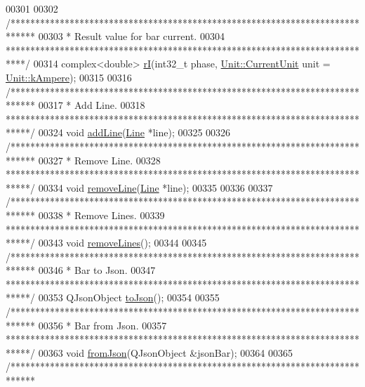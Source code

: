 \begin{DoxyCode}
00301 
00302   \textcolor{comment}{/*****************************************************************************}
00303 \textcolor{comment}{   * Result value for bar current.}
00304 \textcolor{comment}{   ****************************************************************************/}
00314   complex<double> \hyperlink{group___models_ga8a009531f01430aa68eba739bb0dc2ea}{rI}(int32\_t phase, \hyperlink{class_unit_a0794cf6c9682f48296dd4a5315389787}{Unit::CurrentUnit} unit = 
      \hyperlink{class_unit_a0794cf6c9682f48296dd4a5315389787a368a3c470f0b590a6100dda717a7dd4f}{Unit::kAmpere});
00315 
00316   \textcolor{comment}{/*****************************************************************************}
00317 \textcolor{comment}{  * Add Line.}
00318 \textcolor{comment}{  *****************************************************************************/}
00324   \textcolor{keywordtype}{void} \hyperlink{group___models_ga8cbd2f62d92e69ce6c8d561b682464b6}{addLine}(\hyperlink{class_line}{Line} *line);
00325 
00326   \textcolor{comment}{/*****************************************************************************}
00327 \textcolor{comment}{  * Remove Line.}
00328 \textcolor{comment}{  *****************************************************************************/}
00334   \textcolor{keywordtype}{void} \hyperlink{group___models_ga2536c0e5cb97fb627b3520826ece2c99}{removeLine}(\hyperlink{class_line}{Line} *line);
00335 
00336 
00337   \textcolor{comment}{/*****************************************************************************}
00338 \textcolor{comment}{  * Remove Lines.}
00339 \textcolor{comment}{  *****************************************************************************/}
00343   \textcolor{keywordtype}{void} \hyperlink{group___models_ga4ea1a2074cb45968d80d6add571884a4}{removeLines}();
00344 
00345   \textcolor{comment}{/*****************************************************************************}
00346 \textcolor{comment}{  * Bar to Json.}
00347 \textcolor{comment}{  *****************************************************************************/}
00353   QJsonObject \hyperlink{group___models_ga3eb84c42b687db6cd98e11b8bd38c86e}{toJson}();
00354 
00355   \textcolor{comment}{/*****************************************************************************}
00356 \textcolor{comment}{  * Bar from Json.}
00357 \textcolor{comment}{  *****************************************************************************/}
00363   \textcolor{keywordtype}{void} \hyperlink{group___models_ga1df62f03dd3a066ceaf6588ba6bb6004}{fromJson}(QJsonObject &jsonBar);
00364 
00365   \textcolor{comment}{/*****************************************************************************}

\end{DoxyCode}

